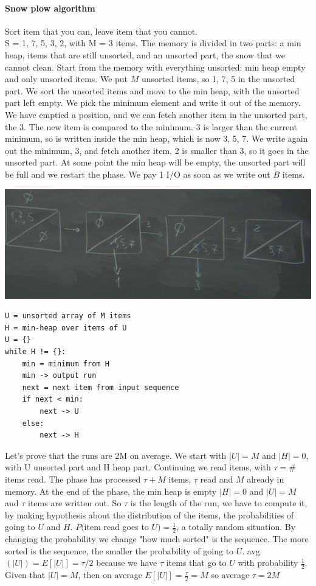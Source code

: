 \documentclass[10pt]{report}
\begin{document}
\paragraph{Snow plow algorithm} Sort item that you can, leave item that you cannot.\\
S = 1, 7, 5, 3, 2, with M = 3 items. The memory is divided in two parts: a min heap, items that are still unsorted, and an unsorted part, the snow that we cannot clean. Start from the memory with everything unsorted: min heap empty and only unsorted items. We put $M$ unsorted items, so 1, 7, 5 in the unsorted part. We sort the unsorted items and move to the min heap, with the unsorted part left empty. We pick the minimum element and write it out of the memory. We have emptied a position, and we can fetch another item in the unsorted part, the 3. The new item is compared to the minimum. 3 is larger than the current minimum, so is written inside the min heap, which is now 3, 5, 7. We write again out the minimum, 3, and fetch another item. 2 is smaller than 3, so it goes in the unsorted part. At some point the min heap will be empty, the unsorted part will be full and we restart the phase. We pay 1 I/O as soon as we write out $B$ items.
\begin{center}
	\includegraphics[scale=0.5]{1.png}
\end{center}
\begin{lstlisting}[style=myPython]
U = unsorted array of M items
H = min-heap over items of U
U = {}
while H != {}:
	min = minimum from H
	min -> output run
	next = next item from input sequence
	if next < min:
		next -> U
	else:
		next -> H
\end{lstlisting}
Let's prove that the runs are 2M on average. We start with $|U| = M$ and $|H| = 0$, with U unsorted part and H heap part. Continuing we read items, with $\tau = \#$ items read. The phase has processed $\tau + M$ items, $\tau$ read and $M$ already in memory. At the end of the phase, the min heap is empty $|H| = 0$ and $|U| = M$ and $\tau$ items are written out. So $\tau$ is the length of the run, we have to compute it, by making hypothesis about the distribution of the items, the probabilities of going to $U$ and $H$. $P($item read goes to $U) = \frac{1}{2}$, a totally random situation. By changing the probability we change "how much sorted" is the sequence. The more sorted is the sequence, the smaller the probability of going to $U$. avg$(|U|) = E[|U|] = \tau/2$ because we have $\tau$ items that go to $U$ with probability $\frac{1}{2}$.\\
Given that $|U| = M$, then on average $E[|U|] = \frac{\tau}{2} = M$ so average $\tau = 2M$
\end{document}
